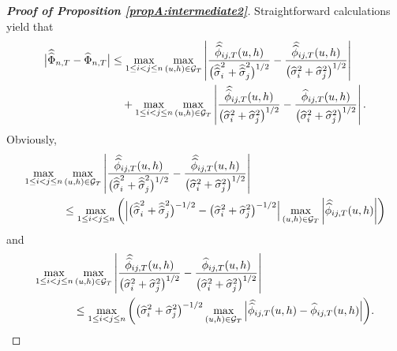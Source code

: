 \begin{proof}[\textnormal{\textbf{Proof of Proposition \ref{propA:intermediate2}}}] 
Straightforward calculations yield that
\begin{align*}
\begin{split}
\big| \doublehattwo{\Phi}_{n, T} - \widehat{\Phi}_{n, T} \big| &\le \max_{1 \le i < j \le n} \max_{(u,h) \in \mathcal{G}_T} \left|\frac{\doublehat{\phi}_{ij,T}(u,h)}{\big(\doublehattwo{\sigma}_i^2 + \doublehattwo{\sigma}_j^2\big)^{1/2}} - \frac{\doublehat{\phi}_{ij,T}(u,h)}{\big(\widehat{\sigma}_i^2 + \widehat{\sigma}_j^2\big)^{1/2}}\right| \\
&\quad+\max_{1 \le i < j \le n} \max_{(u,h) \in \mathcal{G}_T} \left|\frac{\doublehat{\phi}_{ij,T}(u,h)}{\big(\widehat{\sigma}_i^2 + \widehat{\sigma}_j^2\big)^{1/2}} - \frac{\widehat{\phi}_{ij,T}(u,h)} {\big( \widehat{\sigma}_i^2 + \widehat{\sigma}_j^2 \big)^{1/2}} \right|.
\end{split}
\end{align*}
Obviously,
\begin{align*}
\max_{1 \le i < j \le n} &\max_{(u,h) \in \mathcal{G}_T} \left|\frac{\doublehat{\phi}_{ij,T}(u,h)}{\big(\doublehattwo{\sigma}_i^2 + \doublehattwo{\sigma}_j^2\big)^{1/2}} - \frac{\doublehat{\phi}_{ij,T}(u,h)}{\big(\widehat{\sigma}_i^2 + \widehat{\sigma}_j^2\big)^{1/2}}\right|  \\
&\le\max_{1 \le i < j \le n} \left( \Big|\big(\doublehattwo{\sigma}_i^2 + \doublehattwo{\sigma}_j^2 \big)^{-1/2} - \big(\widehat{\sigma}_i^2 + \widehat{\sigma}_j^2 \big)^{-1/2}\Big| \max_{(u,h) \in \mathcal{G}_T} \left|\doublehat{\phi}_{ij,T}(u,h)\right|\right)
\end{align*}
and 
\begin{align*}
\max_{1 \le i < j \le n} &\max_{(u,h) \in \mathcal{G}_T} \left|\frac{\doublehat{\phi}_{ij,T}(u,h)}{\big(\widehat{\sigma}_i^2 + \widehat{\sigma}_j^2\big)^{1/2}} - \frac{\widehat{\phi}_{ij,T}(u,h)} {\big( \widehat{\sigma}_i^2 + \widehat{\sigma}_j^2\big)^{1/2}} \right| \\
&\le \max_{1\le i < j \le n} \bigg( \big(\widehat{\sigma}_i^2 + \widehat{\sigma}_j^2 \big)^{-1/2}\max_{(u,h) \in \mathcal{G}_T} \Big| \doublehat{\phi}_{ij, T}(u,h) - \widehat{\phi}_{ij, T}(u,h) \Big|\bigg).
\end{align*}




\end{proof}
